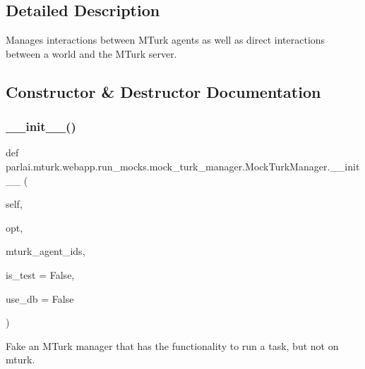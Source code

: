 \subsection{Detailed Description}
\begin{DoxyVerb}Manages interactions between MTurk agents as well as direct interactions between a
world and the MTurk server.
\end{DoxyVerb}
 

\subsection{Constructor \& Destructor Documentation}
\mbox{\label{classparlai_1_1mturk_1_1webapp_1_1run__mocks_1_1mock__turk__manager_1_1MockTurkManager_ac6c394612ebb458f0ddad07f5325eb3d}} 
\subsubsection{\texorpdfstring{\+\_\+\+\_\+init\+\_\+\+\_\+()}{\_\_init\_\_()}}
{\footnotesize\ttfamily def parlai.\+mturk.\+webapp.\+run\+\_\+mocks.\+mock\+\_\+turk\+\_\+manager.\+Mock\+Turk\+Manager.\+\_\+\+\_\+init\+\_\+\+\_\+ (\begin{DoxyParamCaption}\item[{}]{self,  }\item[{}]{opt,  }\item[{}]{mturk\+\_\+agent\+\_\+ids,  }\item[{}]{is\+\_\+test = {\ttfamily False},  }\item[{}]{use\+\_\+db = {\ttfamily False} }\end{DoxyParamCaption})}

\begin{DoxyVerb}Fake an MTurk manager that has the functionality to run a task, but not on
mturk.
\end{DoxyVerb}
 

